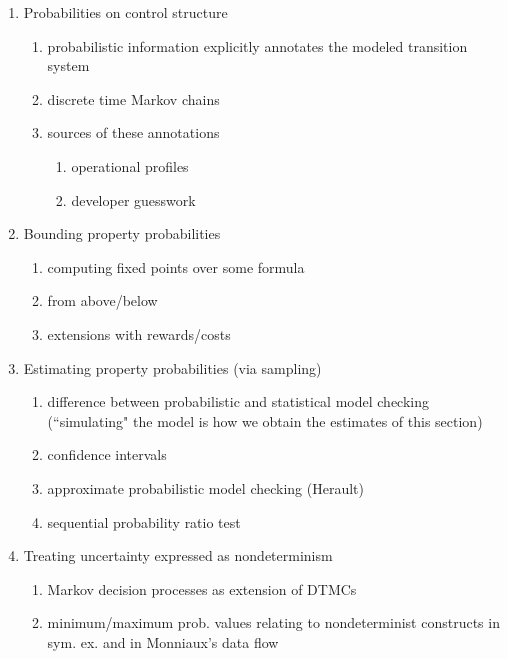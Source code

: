  \begin{enumerate}

   \item Probabilities on control structure
     \begin{enumerate}
      \item probabilistic information explicitly annotates the modeled 
            transition system
      \item discrete time Markov chains
      \item sources of these annotations
        \begin{enumerate}
         \item operational profiles
         \item developer guesswork
        \end{enumerate}
     \end{enumerate}

   \item Bounding property probabilities
     \begin{enumerate}
       \item computing fixed points over some formula
       \item from above/below
       \item extensions with rewards/costs
     \end{enumerate}

   \item Estimating property probabilities (via sampling)
     \begin{enumerate}
      \item difference between probabilistic and statistical model checking
            (``simulating" the model is how we obtain the estimates of this section)
      \item confidence intervals
      \item approximate probabilistic model checking (Herault)
      \item sequential probability ratio test 
     \end{enumerate}

   \item Treating uncertainty expressed as nondeterminism
     \begin{enumerate}
      \item Markov decision processes as extension of DTMCs
      \item minimum/maximum prob. values relating to nondeterminist
            constructs in sym. ex. and in Monniaux's data flow
     \end{enumerate}


\end{enumerate}
